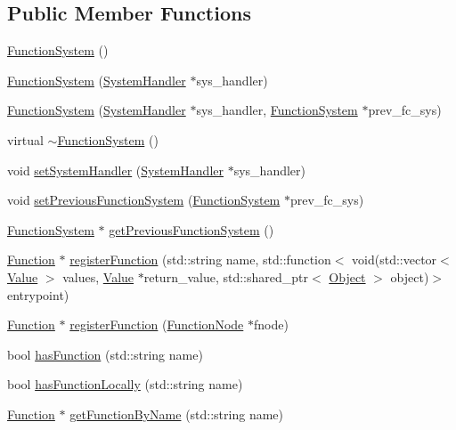 \subsection*{Public Member Functions}
\begin{DoxyCompactItemize}
\item 
\hyperlink{classFunctionSystem_a66e3b5e5118f00a940c3e4a2f138c9c6}{Function\+System} ()
\item 
\hyperlink{classFunctionSystem_a8c2420b3c21af6e84bdf0ef23ccdb0a6}{Function\+System} (\hyperlink{classSystemHandler}{System\+Handler} $\ast$sys\+\_\+handler)
\item 
\hyperlink{classFunctionSystem_aa847d30455d0868179326505ec6384cd}{Function\+System} (\hyperlink{classSystemHandler}{System\+Handler} $\ast$sys\+\_\+handler, \hyperlink{classFunctionSystem}{Function\+System} $\ast$prev\+\_\+fc\+\_\+sys)
\item 
virtual \hyperlink{classFunctionSystem_ad6f794406996091d08df65e8d3e0e665}{$\sim$\+Function\+System} ()
\item 
void \hyperlink{classFunctionSystem_a7924e14b5794c595167aa9d547182883}{set\+System\+Handler} (\hyperlink{classSystemHandler}{System\+Handler} $\ast$sys\+\_\+handler)
\item 
void \hyperlink{classFunctionSystem_a2304a8ecdf5ddad124779b75be69f4a1}{set\+Previous\+Function\+System} (\hyperlink{classFunctionSystem}{Function\+System} $\ast$prev\+\_\+fc\+\_\+sys)
\item 
\hyperlink{classFunctionSystem}{Function\+System} $\ast$ \hyperlink{classFunctionSystem_a2c6914067d4eca5f9c039bed454d072f}{get\+Previous\+Function\+System} ()
\item 
\hyperlink{classFunction}{Function} $\ast$ \hyperlink{classFunctionSystem_a975b09fef826151dd66dece595aa452b}{register\+Function} (std\+::string name, std\+::function$<$ void(std\+::vector$<$ \hyperlink{classValue}{Value} $>$ values, \hyperlink{classValue}{Value} $\ast$return\+\_\+value, std\+::shared\+\_\+ptr$<$ \hyperlink{classObject}{Object} $>$ object)$>$ entrypoint)
\item 
\hyperlink{classFunction}{Function} $\ast$ \hyperlink{classFunctionSystem_a1a3d54c912c91ea7656cc5a6185a9a6f}{register\+Function} (\hyperlink{classFunctionNode}{Function\+Node} $\ast$fnode)
\item 
bool \hyperlink{classFunctionSystem_a7248f494dea505ffaa2108b202f1efcb}{has\+Function} (std\+::string name)
\item 
bool \hyperlink{classFunctionSystem_a5bb3f64848489ff7cc4c982c08a10eaa}{has\+Function\+Locally} (std\+::string name)
\item 
\hyperlink{classFunction}{Function} $\ast$ \hyperlink{classFunctionSystem_a6ccd76d0760272b64790d6f5c8cdc607}{get\+Function\+By\+Name} (std\+::string name)
\end{DoxyCompactItemize}
